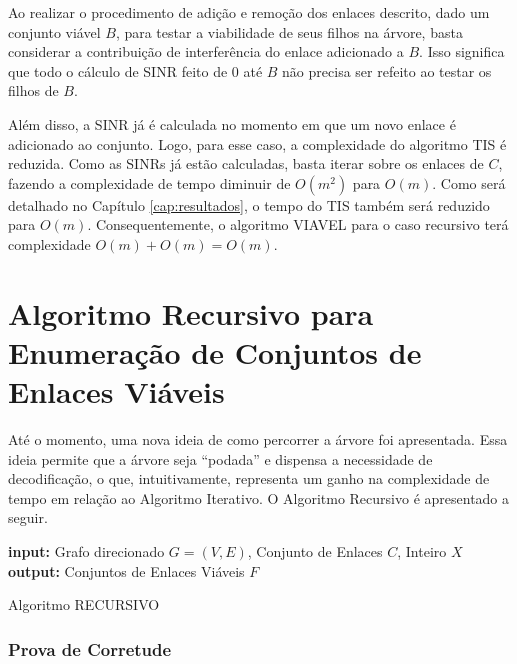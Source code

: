 Ao realizar o procedimento de adição e remoção dos enlaces descrito, dado um conjunto viável $B$, para testar a viabilidade de seus filhos na árvore, basta considerar a contribuição de interferência do enlace adicionado a $B$. Isso significa que todo o cálculo de SINR feito de 0 até $B$ não precisa ser refeito ao testar os filhos de $B$.

Além disso, a SINR já é calculada no momento em que um novo enlace é adicionado ao conjunto. Logo, para esse caso, a complexidade do algoritmo TIS é reduzida. Como as SINRs já estão calculadas, basta iterar sobre os enlaces de $C$, fazendo a complexidade de tempo diminuir de $O(m^2)$ para $O(m)$. Como será detalhado no Capítulo \ref{cap:resultados}, o tempo do TIS também será reduzido para $O(m)$. Consequentemente, o algoritmo VIAVEL para o caso recursivo terá complexidade $O(m) + O(m) = O(m)$. 

\section{Algoritmo Recursivo para Enumeração de Conjuntos de Enlaces Viáveis}

Até o momento, uma nova ideia de como percorrer a árvore foi apresentada. Essa ideia permite que a árvore seja “podada” e dispensa a necessidade de decodificação, o que, intuitivamente, representa um ganho na complexidade de tempo em relação ao Algoritmo Iterativo. O Algoritmo Recursivo é apresentado a seguir.

\begin{algorithm}[h]
	\SetVline
	{\bf input:} Grafo direcionado $G=(V,E)$, Conjunto de Enlaces $C$, Inteiro $X$\\
	{\bf output:} Conjuntos de Enlaces Viáveis $F$\\
\caption{Algoritmo RECURSIVO}
\label{alg:recursivo}
\end{algorithm}

\subsubsection{Prova de Corretude}

